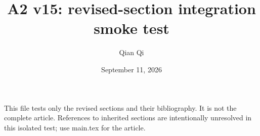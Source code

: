 
\title{A2 v15: revised-section integration smoke test}
\author{Qian Qi}
\date{September 11, 2026}

\maketitle
\noindent This file tests only the revised sections and their bibliography.
It is not the complete article. References to inherited sections are
intentionally unresolved in this isolated test; use main.tex for the article.





